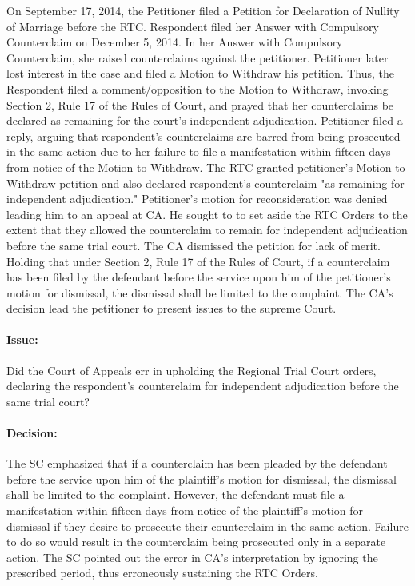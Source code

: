 \documentclass[
12pt,
oneside,
onehalfspacing,
headsepline
]{DigestCollection}
\begin{document}
On September 17, 2014, the Petitioner filed a Petition for Declaration of Nullity of Marriage before the RTC. Respondent filed her Answer with Compulsory Counterclaim on December 5, 2014. In her Answer with Compulsory Counterclaim, she raised counterclaims against the petitioner. Petitioner later lost interest in the case and filed a Motion to Withdraw his petition. Thus, the Respondent filed a comment/opposition to the Motion to Withdraw, invoking Section 2, Rule 17 of the Rules of Court, and prayed that her counterclaims be declared as remaining for the court's independent adjudication. Petitioner filed a reply, arguing that respondent's counterclaims are barred from being prosecuted in the same action due to her failure to file a manifestation within fifteen days from notice of the Motion to Withdraw. The RTC granted petitioner’s Motion to Withdraw petition and also declared respondent's counterclaim "as remaining for independent adjudication." Petitioner's motion for reconsideration was denied leading him to an appeal at CA. He sought to to set aside the RTC Orders to the extent that they allowed the counterclaim to remain for independent adjudication before the same trial court. The CA dismissed the petition for lack of merit. Holding that under Section 2, Rule 17 of the Rules of Court, if a counterclaim has been filed by the defendant before the service upon him of the petitioner’s motion for dismissal, the dismissal shall be limited to the complaint. The CA's decision lead the petitioner to present issues to the supreme Court.

\paragraph{Issue:}
\label{b26b3140-09fd-11ef-932c-63c852f65e48}


Did the Court of Appeals err in upholding the Regional Trial Court orders, declaring the respondent's counterclaim for independent adjudication before the same trial court?

\paragraph{Decision:}
\label{b3dce9b0-09fd-11ef-932c-63c852f65e48}


The SC emphasized that if a counterclaim has been pleaded by the defendant before the service upon him of the plaintiff's motion for dismissal, the dismissal shall be limited to the complaint. However, the defendant must file a manifestation within fifteen days from notice of the plaintiff's motion for dismissal if they desire to prosecute their counterclaim in the same action. Failure to do so would result in the counterclaim being prosecuted only in a separate action. The SC pointed out the error in CA's interpretation by ignoring the prescribed period, thus erroneously sustaining the RTC Orders.
\end{document}
